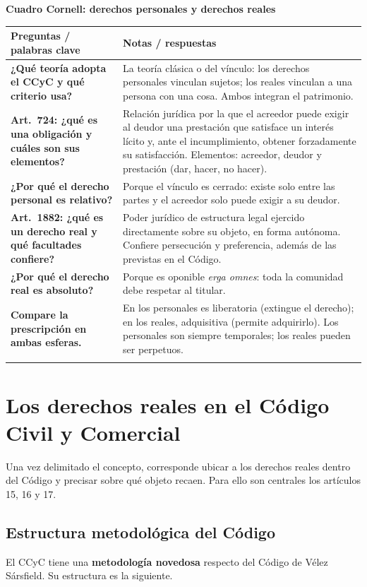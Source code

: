 \documentclass[12pt,oneside]{book}
\renewcommand{\arraystretch}{1.25}
\newcommand{\cq}[2]{\textbf{#1} & #2 \\[0.45em]}
\newcommand{\cornell}[3]{%
\par\bigskip\noindent\textbf{\large Cuadro Cornell: #1}\par\smallskip
\begin{center}
\small
\renewcommand{\arraystretch}{1.15}
\begin{tabularx}{\textwidth}{>{\raggedright\arraybackslash}p{0.27\textwidth}>{\raggedright\arraybackslash}X}
\toprule
\textbf{Preguntas / palabras clave} & \textbf{Notas / respuestas} \\
\midrule
#2
\midrule
\multicolumn{2}{p{\dimexpr\textwidth-2\tabcolsep\relax}}{\textbf{Resumen.} #3} \\
\bottomrule
\end{tabularx}
\end{center}
}
\begin{document}
\cornell{derechos personales y derechos reales}{
\cq{¿Qué teoría adopta el CCyC y qué criterio usa?}{La teoría clásica o del vínculo: los derechos personales vinculan sujetos; los reales vinculan a una persona con una cosa. Ambos integran el patrimonio.}
\cq{Art.~724: ¿qué es una obligación y cuáles son sus elementos?}{Relación jurídica por la que el acreedor puede exigir al deudor una prestación que satisface un interés lícito y, ante el incumplimiento, obtener forzadamente su satisfacción. Elementos: acreedor, deudor y prestación (dar, hacer, no hacer).}
\cq{¿Por qué el derecho personal es relativo?}{Porque el vínculo es cerrado: existe solo entre las partes y el acreedor solo puede exigir a su deudor.}
\cq{Art.~1882: ¿qué es un derecho real y qué facultades confiere?}{Poder jurídico de estructura legal ejercido directamente sobre su objeto, en forma autónoma. Confiere persecución y preferencia, además de las previstas en el Código.}
\cq{¿Por qué el derecho real es absoluto?}{Porque es oponible \textit{erga omnes}: toda la comunidad debe respetar al titular.}
\cq{Compare la prescripción en ambas esferas.}{En los personales es liberatoria (extingue el derecho); en los reales, adquisitiva (permite adquirirlo). Los personales son siempre temporales; los reales pueden ser perpetuos.}
}{El Código distingue los derechos personales (vínculo entre acreedor y deudor, relativo, temporal, regido por la autonomía de la voluntad) de los reales (vínculo directo con la cosa, absoluto, de estructura legal y orden público, con persecución y preferencia). Ambos integran el patrimonio.}

\chapter[Los derechos reales en el Código Civil y Comercial]{Los derechos reales en el Código Civil y Comercial}\label{cap:ccyc}

Una vez delimitado el concepto, corresponde ubicar a los derechos reales dentro del Código y precisar sobre qué objeto recaen. Para ello son centrales los artículos 15, 16 y 17.

\section{Estructura metodológica del Código}

El CCyC tiene una \textbf{metodología novedosa} respecto del Código de Vélez Sársfield. Su estructura es la siguiente.
\end{document}
